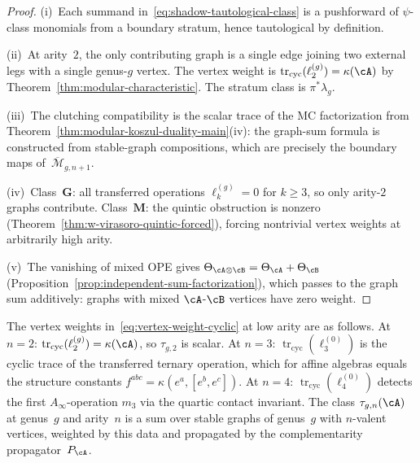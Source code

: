 \begin{proof}
(i)~Each summand in~\eqref{eq:shadow-tautological-class} is a
pushforward of $\psi$-class monomials from a boundary stratum,
hence tautological by definition.

(ii)~At arity~$2$, the only contributing graph is a single edge
joining two external legs with a single genus-$g$ vertex.
The vertex weight is
$\operatorname{tr}_{\mathrm{cyc}}(\ell_2^{(g)}) = \kappa(\cA)$
by Theorem~\ref{thm:modular-characteristic}.
The stratum class is $\pi^*\lambda_g$.

(iii)~The clutching compatibility is the scalar trace of the
MC factorization from
Theorem~\ref{thm:modular-koszul-duality-main}(iv):
the graph-sum formula is constructed from stable-graph
compositions, which are precisely the boundary maps
of~$\overline{\mathcal{M}}_{g,n+1}$.

(iv)~Class~$\mathbf{G}$: all transferred operations
$\ell_k^{(g)} = 0$ for $k \geq 3$, so only arity-$2$
graphs contribute.
Class~$\mathbf{M}$: the quintic obstruction is nonzero
(Theorem~\ref{thm:w-virasoro-quintic-forced}), forcing
nontrivial vertex weights at arbitrarily high arity.

(v)~The vanishing of mixed OPE gives
$\Theta_{\cA \otimes \cB} = \Theta_\cA + \Theta_\cB$
(Proposition~\ref{prop:independent-sum-factorization}),
which passes to the graph sum additively: graphs with
mixed $\cA$-$\cB$ vertices have zero weight.
\end{proof}

\begin{remark}
\label{rem:shadow-moduli-theoretic}
The vertex weights in~\eqref{eq:vertex-weight-cyclic} at
low arity are as follows.  At $n = 2$:
$\operatorname{tr}_{\mathrm{cyc}}(\ell_2^{(g)}) = \kappa(\cA)$,
so $\tau_{g,2}$ is scalar.  At $n = 3$:
$\operatorname{tr}_{\mathrm{cyc}}(\ell_3^{(0)})$ is the cyclic
trace of the transferred ternary operation, which for affine
algebras equals the structure constants
$f^{abc} = \kappa(e^a,[e^b,e^c])$.  At $n = 4$:
$\operatorname{tr}_{\mathrm{cyc}}(\ell_4^{(0)})$ detects the
first $A_\infty$-operation $m_3$ via the quartic contact
invariant.  The class $\tau_{g,n}(\cA)$ at genus~$g$ and
arity~$n$ is a sum over stable graphs of genus~$g$ with
$n$-valent vertices, weighted by this data and propagated by
the complementarity propagator~$P_\cA$.
\end{remark}

